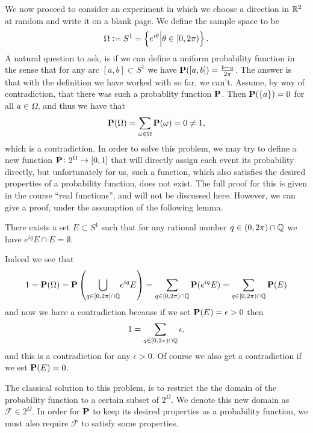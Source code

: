 \documentclass[11pt,a4paper]{article}
\begin{document}
\begin{example}
  \label{exmp:direction-in-the-plane}
  We now proceed to consider an experiment in which we choose a direction in
  $\mathbb{R}^2$ at random and write it on a blank page.
  We define the sample space to be
  \[
    \Omega := S^1 = \left\{e^{i \theta} \middle\vert \theta \in [0,2 \pi)\right\}.
  \]
  A natural question to ask, is if we can define a uniform probability function
  in the sense that for any arc $[a,b] \subset S^1$ we have 
  $\mathbf{P}([a,b]) = \frac{b - a}{2\pi}$.
  The answer is that with the definition we have
  worked with so far, we can't.
  Assume, by way of contradiction, that
  there was such a probablity function $\mathbf{P}$.
  Then $\mathbf{P}(\{a\}) = 0$ for 
  all $a \in \Omega$,
  and thus we have that
  \[
    \mathbf{P}(\Omega) = \sum_{\omega \in \Omega}{\mathbf{P}(\omega)} = 0 \neq 1,
  \]
  which is a contradiction.
  In order to solve this problem, we may try to define a new function
  $\mathbf{P} \colon 2^\Omega \to [0,1]$
  that will directly assign each event its probability directly,
  but unfortunately for us, such a function, which also satisfies the desired
  properties of a probability function, does not exist.
  The full proof for this is given in the course ``real functions'',
  and will not be discussed here.
  However, we can give a proof, under the assumption of the following lemma.

  \begin{lemma}
    There exists a set $E \subset S^1$ such that for any rational number 
    $q \in (0, 2 \pi) \cap \mathbb{Q}$ we have $e^{i q}E \cap E = \emptyset$.
  \end{lemma}

  Indeed we see that
  \[
    1 = \mathbf{P}(\Omega) = 
    \mathbf{P}\left({\bigcup_{q \in [0,2\pi] \cap \mathbb{Q}}}{e^{i q} E}\right) = 
    \sum_{q \in [0,2\pi) \cap \mathbb{Q}}{\mathbf{P}(e^{i q} E)} = 
    \sum_{q \in [0,2\pi) \cap \mathbb{Q}}{\mathbf{P}(E)}
  \]
  and now we have a contradiction because if we set $\mathbf{P}(E) = \epsilon > 0$
  then
  \[
    1 = \sum_{q \in [0,2\pi) \cap \mathbb{Q}} \epsilon,
  \]
  and this is a contradiction for any $\epsilon > 0$.
  Of course we also get a contradiction if we set $\mathbf{P}(E) = 0$.

  The classical solution to this problem, is to restrict the the domain
  of the probability function to a certain subset of $2^{\Omega}$.
  We denote this new domain as $\mathcal F \in 2^\Omega$.
  In order for $\mathbf{P}$ to keep its desired properties as a probability function,
  we must also require $\mathcal F$ to satisfy some properties.
\end{example}
\end{document}
